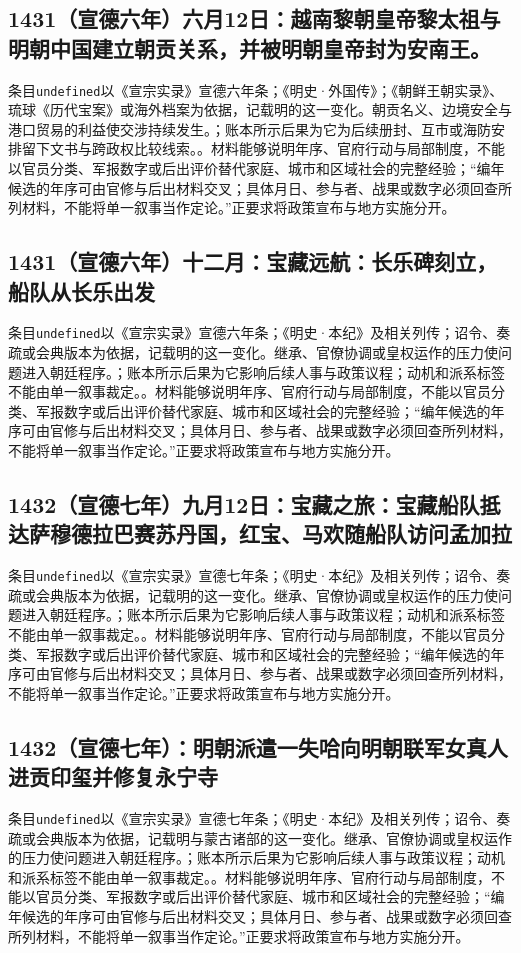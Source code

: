 \subsection{1431（宣德六年）六月12日：越南黎朝皇帝黎太祖与明朝中国建立朝贡关系，并被明朝皇帝封为安南王。}
条目\texttt{undefined}以《宣宗实录》宣德六年条；《明史·外国传》；《朝鲜王朝实录》、琉球《历代宝案》或海外档案为依据，记载明的这一变化。朝贡名义、边境安全与港口贸易的利益使交涉持续发生。；账本所示后果为它为后续册封、互市或海防安排留下文书与跨政权比较线索。。材料能够说明年序、官府行动与局部制度，不能以官员分类、军报数字或后出评价替代家庭、城市和区域社会的完整经验；“编年候选的年序可由官修与后出材料交叉；具体月日、参与者、战果或数字必须回查所列材料，不能将单一叙事当作定论。”正要求将政策宣布与地方实施分开。

\subsection{1431（宣德六年）十二月：宝藏远航：长乐碑刻立，船队从长乐出发}
条目\texttt{undefined}以《宣宗实录》宣德六年条；《明史·本纪》及相关列传；诏令、奏疏或会典版本为依据，记载明的这一变化。继承、官僚协调或皇权运作的压力使问题进入朝廷程序。；账本所示后果为它影响后续人事与政策议程；动机和派系标签不能由单一叙事裁定。。材料能够说明年序、官府行动与局部制度，不能以官员分类、军报数字或后出评价替代家庭、城市和区域社会的完整经验；“编年候选的年序可由官修与后出材料交叉；具体月日、参与者、战果或数字必须回查所列材料，不能将单一叙事当作定论。”正要求将政策宣布与地方实施分开。

\subsection{1432（宣德七年）九月12日：宝藏之旅：宝藏船队抵达萨穆德拉巴赛苏丹国，红宝、马欢随船队访问孟加拉}
条目\texttt{undefined}以《宣宗实录》宣德七年条；《明史·本纪》及相关列传；诏令、奏疏或会典版本为依据，记载明的这一变化。继承、官僚协调或皇权运作的压力使问题进入朝廷程序。；账本所示后果为它影响后续人事与政策议程；动机和派系标签不能由单一叙事裁定。。材料能够说明年序、官府行动与局部制度，不能以官员分类、军报数字或后出评价替代家庭、城市和区域社会的完整经验；“编年候选的年序可由官修与后出材料交叉；具体月日、参与者、战果或数字必须回查所列材料，不能将单一叙事当作定论。”正要求将政策宣布与地方实施分开。

\subsection{1432（宣德七年）：明朝派遣一失哈向明朝联军女真人进贡印玺并修复永宁寺}
条目\texttt{undefined}以《宣宗实录》宣德七年条；《明史·本纪》及相关列传；诏令、奏疏或会典版本为依据，记载明与蒙古诸部的这一变化。继承、官僚协调或皇权运作的压力使问题进入朝廷程序。；账本所示后果为它影响后续人事与政策议程；动机和派系标签不能由单一叙事裁定。。材料能够说明年序、官府行动与局部制度，不能以官员分类、军报数字或后出评价替代家庭、城市和区域社会的完整经验；“编年候选的年序可由官修与后出材料交叉；具体月日、参与者、战果或数字必须回查所列材料，不能将单一叙事当作定论。”正要求将政策宣布与地方实施分开。

